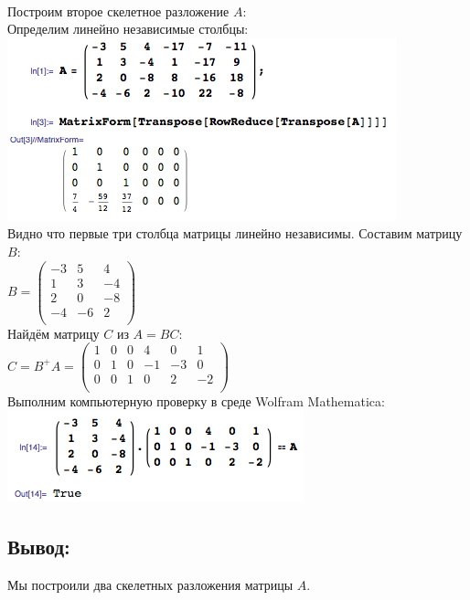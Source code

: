 \\[1em]
Построим второе скелетное разложение $ A $:
\\
Определим линейно независимые столбцы:
\\
\includegraphics[scale=0.6]{task/2_16/screen3.png}
\\
Видно что первые три столбца матрицы линейно независимы. Составим матрицу $ B $:
\\[1em]
$
	B =
	\begin{pmatrix}
		-3 & 5 & 4 \\
		1 & 3 & -4 \\
		2 & 0 & -8 \\
		-4 & -6 & 2 \\
	\end{pmatrix}
$
\\[1em]
Найдём матрицу $ C $ из $ A = BC $:
\\[1em]
$
	C = B^{+}A =
	\begin{pmatrix}
		1 & 0 & 0 & 4 & 0 & 1 \\
		0 & 1 & 0 & -1 & -3 & 0 \\
		0 & 0 & 1 & 0 & 2 & -2 \\
	\end{pmatrix}
$
\\[1em]
Выполним компьютерную проверку в среде Wolfram Mathematica:
\\
\includegraphics[scale=0.6]{task/2_16/screen4.png}
\subsection{Вывод:}
Мы построили два скелетных разложения матрицы $ A $.
